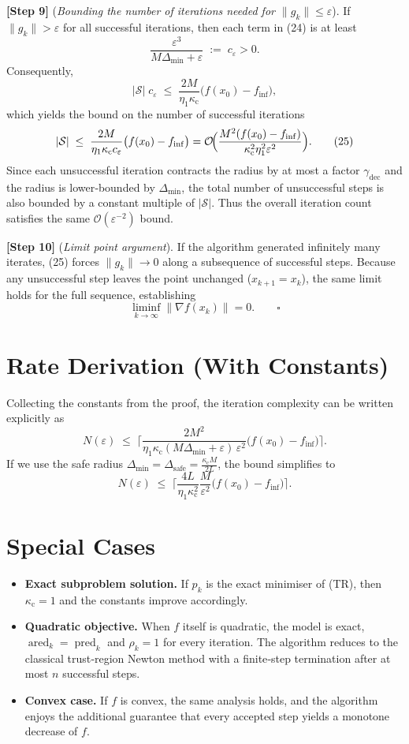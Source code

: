 \documentclass{article}
\newcommand{\norm}[1]{\left\lVert#1\right\rVert}
\begin{document}
\noindent\textbf{[Step 9]} (\emph{Bounding the number of iterations needed for
\(\|g_k\|\le\varepsilon\)}).  
If \(\|g_k\|>\varepsilon\) for all successful iterations, then each term in
(24) is at least
\[
\frac{\varepsilon^{3}}{M\Delta_{\min}+ \varepsilon}
\;:=\;c_{\varepsilon}>0.
\]
Consequently,
\[
|\mathcal{S}|\;c_{\varepsilon}
\;\le\;
\frac{2M}{\eta_1\kappa_{\mathrm{c}}}\bigl(f(x_0)-f_{\inf}\bigr),
\]
which yields the bound on the number of successful iterations
\[
|\mathcal{S}|
\;\le\;
\frac{2M}{\eta_1\kappa_{\mathrm{c}}c_{\varepsilon}}
\bigl(f(x_0)-f_{\inf}\bigr)
=
\mathcal{O}\!\Bigl(\frac{M^{2}(f(x_0)-f_{\inf})}
{\kappa_{\mathrm{c}}^{2}\eta_1^{2}\varepsilon^{2}}\Bigr).
\tag{25}
\]
Since each unsuccessful iteration contracts the radius by at most a factor
\(\gamma_{\mathrm{dec}}\) and the radius is lower‑bounded by \(\Delta_{\min}\),
the total number of unsuccessful steps is also bounded by a constant multiple
of \(|\mathcal{S}|\).  Thus the overall iteration count satisfies the same
\(\mathcal{O}(\varepsilon^{-2})\) bound.

\noindent\textbf{[Step 10]} (\emph{Limit point argument}).  
If the algorithm generated infinitely many iterates, (25) forces
\(\|g_k\|\to0\) along a subsequence of successful steps.  Because any
unsuccessful step leaves the point unchanged (\(x_{k+1}=x_k\)), the same limit
holds for the full sequence, establishing
\[
\liminf_{k\to\infty}\norm{\nabla f(x_k)}=0.
\qquad\square
\]

\section*{Rate Derivation (With Constants)}
Collecting the constants from the proof, the iteration complexity can be written
explicitly as
\[
N(\varepsilon)
\;\le\;
\Biggl\lceil
\frac{2M^{2}}{\eta_1\kappa_{\mathrm{c}}(M\Delta_{\min}+\varepsilon)\,\varepsilon^{2}}
\bigl(f(x_0)-f_{\inf}\bigr)
\Biggr\rceil .
\]
If we use the safe radius \(\Delta_{\min}=\Delta_{\mathrm{safe}}
=\frac{\kappa_{\mathrm{c}}M}{2L}\), the bound simplifies to
\[
N(\varepsilon)
\;\le\;
\Biggl\lceil
\frac{4L}{\eta_1\kappa_{\mathrm{c}}^{2}}
\frac{M}{\varepsilon^{2}}
\bigl(f(x_0)-f_{\inf}\bigr)
\Biggr\rceil .
\]

\section*{Special Cases}
\begin{itemize}[leftmargin=*]
\item \textbf{Exact subproblem solution.}
If \(p_k\) is the exact minimiser of (TR), then \(\kappa_{\mathrm{c}}=1\) and the
constants improve accordingly.
\item \textbf{Quadratic objective.}
When \(f\) itself is quadratic, the model is exact, \(\operatorname{ared}_k=
\operatorname{pred}_k\) and \(\rho_k=1\) for every iteration.  The algorithm
reduces to the classical trust‑region Newton method with a finite‑step
termination after at most \(n\) successful steps.
\item \textbf{Convex case.}
If \(f\) is convex, the same analysis holds, and the algorithm enjoys the
additional guarantee that every accepted step yields a monotone decrease of
\(f\).
\end{itemize}
\end{document}
